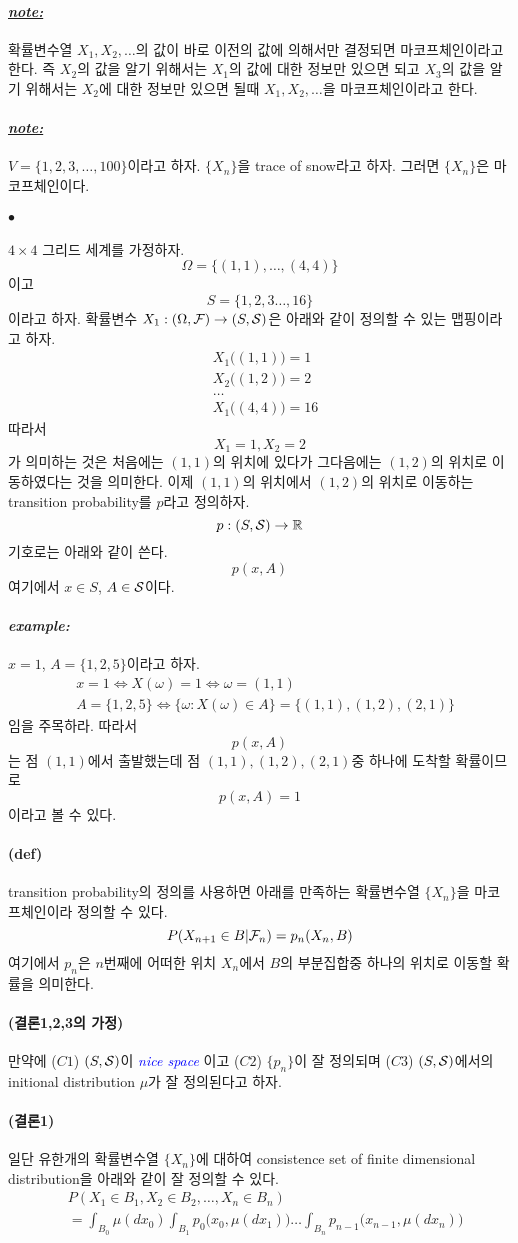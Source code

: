 \documentclass[12pt,oneside,english]{book}
\def\ck{\paragraph{\Large$\bullet$}\Large}
\def\note{\paragraph{\Large\textit{\underline{note:}}}\Large}
\def\ex{\paragraph{\Large\textit{example:}}\Large}
\newcommand{\para}[1]{\paragraph{\Large(#1)}\Large}
\begin{document}
\note 확률변수열 $X_1,X_2,\dots$의 값이 바로 이전의 값에 의해서만 결정되면 마코프체인이라고 한다. 즉 $X_2$의 값을 알기 위해서는 $X_1$의 값에 대한 정보만 있으면 되고 $X_3$의 값을 알기 위해서는 $X_2$에 대한 정보만 있으면 될때 $X_1,X_2,\dots$을 마코프체인이라고 한다. 

\note $V=\{1,2,3,\dots,100\}$이라고 하자. $\{X_n\}$을 trace of snow라고 하자. 그러면 $\{X_n\}$은 마코프체인이다. 

\ck $4\times 4$ 그리드 세계를 가정하자. 
\[
\Omega=\{(1,1),\dots,(4,4)\}
\]
이고 
\[
S=\{1,2,3\dots,16\}
\]
이라고 하자. 확률변수 $X_1:(\Omega,{\cal F}) \to (S, {\cal S})$은 아래와 같이 정의할 수 있는 맵핑이라고 하자. 
\begin{align*}
& X_1\big((1,1)\big)=1\\ 
& X_2\big((1,2))=2\\ 
& \dots \\
& X_1\big((4,4)\big)=16
\end{align*}
따라서 
\[
X_1=1, X_2=2
\]
가 의미하는 것은 처음에는 $(1,1)$의 위치에 있다가 그다음에는 $(1,2)$의 위치로 이동하였다는 것을 의미한다. 이제 $(1,1)$의 위치에서 $(1,2)$의 위치로 이동하는 transition probability를 $p$라고 정의하자. 
\[
p:(S,{\cal S}) \to \mathbb{R}
\]
기호로는 아래와 같이 쓴다. 
\[
p(x,A)
\]
여기에서 $x \in S$, $A \in {\cal S}$이다. 

\ex $x=1$, $A=\{1,2,5\}$이라고 하자. 
\begin{align*}
& x=1 \Leftrightarrow X(\omega)=1 \Leftrightarrow \omega=(1,1) \\ 
& A=\{1,2,5\} \Leftrightarrow \{\omega:X(\omega) \in A\}=\{(1,1),(1,2),(2,1)\}
\end{align*}
임을 주목하라. 따라서 
\[
p(x,A)
\] 
는 점 $(1,1)$에서 출발했는데 점 $(1,1),(1,2),(2,1)$중 하나에 도착할 확률이므로 
\[
p(x,A)=1
\]
이라고 볼 수 있다. 

\para{def} transition probability의 정의를 사용하면 아래를 만족하는 확률변수열 $\{X_n\}$을 마코프체인이라 정의할 수 있다. 
\[
P(X_{n+1}\in B|{\cal F}_n)=p_n(X_n,B)
\]
여기에서 $p_n$은 $n$번째에 어떠한 위치 $X_n$에서 $B$의 부분집합중 하나의 위치로 이동할 확률을 의미한다. 

\para{결론1,2,3의 가정} 만약에 ($C1$) $(S,{\cal S})$이 \textcolor{blue}{\emph{nice space}} 이고 ($C2$) $\{p_n\}$이 잘 정의되며 ($C3$) $(S,{\cal S})$에서의 initional distribution $\mu$가 잘 정의된다고 하자. 

\para{결론1} 일단 유한개의 확률변수열 $\{X_n\}$에 대하여 consistence set of finite dimensional distribution을 아래와 같이 잘 정의할 수 있다. 
\begin{align*}
& P(X_1\in B_1, X_2\in B_2, \dots, X_n \in B_n)\\
& = \int_{B_0}\mu(dx_0)\int_{B_1}p_0\big(x_0,\mu(dx_1)\big)\dots\int_{B_n}p_{n-1}\big(x_{n-1},\mu(dx_n)\big)
\end{align*}
\end{document}
